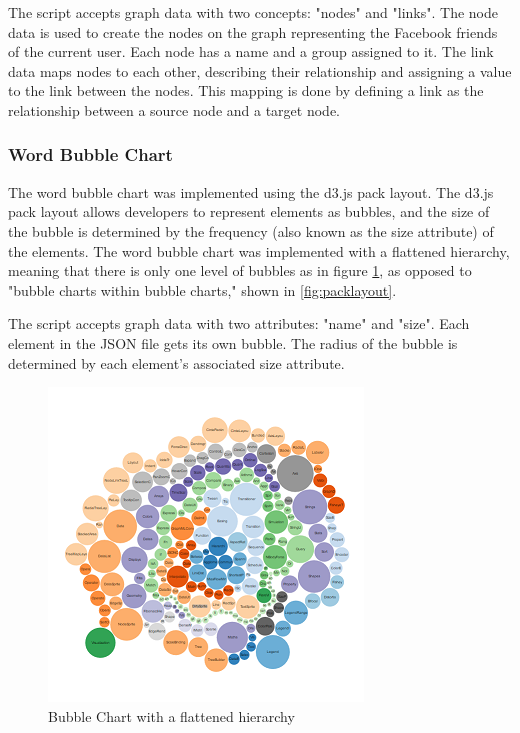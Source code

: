 \documentclass[12pt,onecolumn]{article}
\begin{document}
	The script accepts graph data with two concepts: "nodes" and "links". The node data is used to create the nodes on the graph representing the Facebook friends of the current user. Each node has a name and a group assigned to it. The link data maps nodes to each other, describing their relationship and assigning a value to the link between the nodes. This mapping is done by defining a link as the relationship between a source node and a target node.
	
	\subsubsection{Word Bubble Chart}
	The word bubble chart was implemented using the d3.js pack layout. The d3.js pack layout allows developers to represent elements as bubbles, and the size of the bubble is determined by the frequency (also known as the size attribute) of the elements. The word bubble chart was implemented with a flattened hierarchy, meaning that there is only one level of bubbles as in figure \ref{fig:bubblechart}, as opposed to "bubble charts within bubble charts," shown in \ref{fig:packlayout}.
	
  	The script accepts graph data with two attributes: "name" and "size". Each element in the JSON file gets its own bubble. The radius of the bubble is determined by each element's associated size attribute.
  	
   \begin{figure}
   	\centering
   	\includegraphics[scale=1]{bubblechart.PNG}
   	\caption{Bubble Chart with a flattened hierarchy} \label{fig:bubblechart}
   \end{figure}
   
\end{document}
